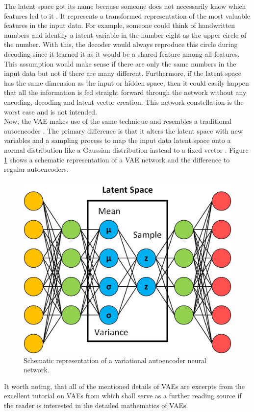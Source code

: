 \documentclass[MGS,Master,english]{twbook}%
\begin{document}
The latent space got its name because someone does not necessarily know which features led to it \cite{ml::vae::tutorial}. It represents a transformed representation of the most valuable features in the input data. For example, someone could think of handwritten numbers and identify a latent variable in the number eight as the upper circle of the number. With this, the decoder would always reproduce this circle during decoding since it learned it as it would be a shared feature among all features. This assumption would make sense if there are only the same numbers in the input data but not if there are many different. Furthermore, if the latent space has the same dimension as the input or hidden space, then it could easily happen that all the information is fed straight forward through the network without any encoding, decoding and latent vector creation. This network constellation is the worst case and is not intended.\\
Now, the \ac{VAE} makes use of the same technique and resembles a traditional autoencoder \cite{ml::vae::tutorial}. The primary difference is that it alters the latent space with new variables and a sampling process to map the input data latent space onto a normal distribution like a Gaussian distribution instead to a fixed vector \cite{ml::vae::tutorial}. Figure \ref{fig::vae} shows a schematic representation of a VAE network and the difference to regular autoencoders. 
\begin{figure}[!htbp]
	\centering
	\includegraphics[width=0.65\linewidth]{PICs/NNs/variational_autoencoder}
	\caption{Schematic representation of a variational autoencoder neural network.} \label{fig::vae}
\end{figure}

It worth noting, that all of the mentioned details of VAEs are excerpts from the excellent tutorial on VAEs from \citep{ml::vae::tutorial} which shall serve as a further reading source if the reader is interested in the detailed mathematics of VAEs.
\end{document}
